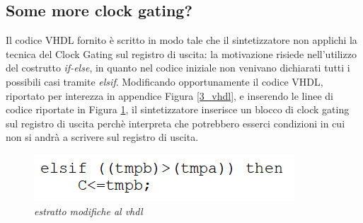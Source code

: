 \subsection{Some more clock gating?}
Il codice VHDL fornito è scritto in modo tale che il sintetizzatore non applichi la tecnica del Clock Gating sul registro di uscita: la motivazione risiede nell'utilizzo del costrutto \textit{if-else}, in quanto nel codice iniziale non venivano dichiarati tutti i possibili casi tramite \textit{elsif}. Modificando opportunamente il codice VHDL,  riportato per interezza in appendice Figura \ref{3_vhdl}, e inserendo le linee di codice riportate in Figura \ref{3_vhdl_2}, il sintetizzatore inserisce un blocco di clock gating sul registro di uscita perchè interpreta che potrebbero esserci condizioni in cui non si andrà a scrivere sul registro di uscita.
\begin{figure}[!htb]
	\centering
	\includegraphics[scale=1.5]{immagini/3_vhdl_2}
	\caption{\textit{estratto modifiche al vhdl}}
	\label{3_vhdl_2}
\end{figure}

